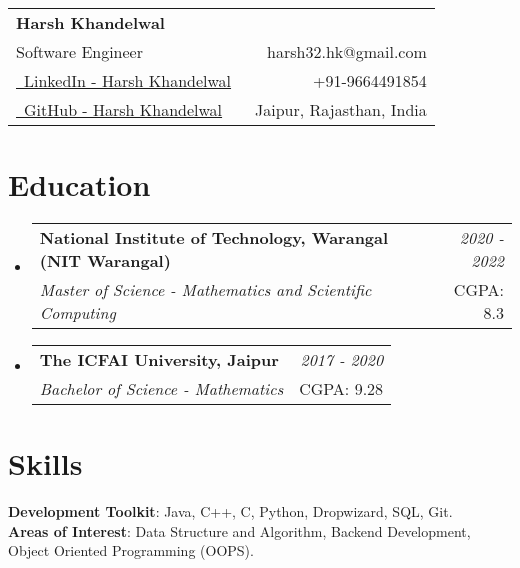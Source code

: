 \documentclass[a4paper,12pt]{article}
\makeatletter
\newcommand{\resumeSubheading}[4]{
\vspace{0.5mm}\item[]
    \begin{tabular*}{0.98\textwidth}[t]{l@{\extracolsep{\fill}}r}
        \textbf{#1} & \textit{\footnotesize{#4}} \\
        \textit{\footnotesize{#3}} &  \footnotesize{#2}\\
    \end{tabular*}
    \vspace{-1.0mm}
}
\newcommand{\resumeSubHeadingListStart}{\begin{itemize}[leftmargin=*,labelsep=0mm]}
\newcommand{\resumeSubHeadingListEnd}{\end{itemize}\vspace{2mm}}
\newcommand{\name}{Harsh Khandelwal} %
\newcommand{\phone}{9664491854} %
\newcommand{\emaila}{harsh32.hk@gmail.com} %
\makeatother
\begin{document}


\parbox{\dimexpr\linewidth-0.5cm\relax}{
\begin{tabularx}{\linewidth}{L r} \\
  \textbf{\Large \name}\\
  {Software Engineer} & \raisebox{0.0\height}{\footnotesize \faEnvelope}\ {\emaila} \\
  \href{https://www.linkedin.com/in/harsh-khandelwal-094866201/}{\raisebox{0.0\height}{\footnotesize \faLinkedin}\ LinkedIn - Harsh Khandelwal} &  {\raisebox{0.0\height}{\footnotesize \faPhone}\ +91-\phone} \\
  \href{https://github.com/redhlk}{\raisebox{0.0\height}{\footnotesize \faGithub}\ {GitHub - \name}}
  & {\raisebox{0.0\height}{\footnotesize}\ Jaipur, Rajasthan, India}\\
\end{tabularx}
}

\section{\textbf{Education}}
  \resumeSubHeadingListStart
    \resumeSubheading
      {National Institute of Technology, Warangal (NIT Warangal)}{CGPA: 8.3}
      {Master of Science - Mathematics and Scientific Computing }{2020 - 2022}
    \resumeSubheading
      {The ICFAI University, Jaipur}{CGPA: 9.28}
      {Bachelor of Science - Mathematics}{2017 - 2020}
  \resumeSubHeadingListEnd
\vspace{-5.5mm}
%


\section{\textbf{Skills}}
 \begin{itemize}[leftmargin=0.05in, label={}]
    \small{\item{
     \textbf{Development Toolkit}{: Java, C++, C, Python, Dropwizard, SQL, Git.} \\
         \vspace{2pt}
     \textbf{Areas of Interest}{: Data Structure and Algorithm, Backend Development, Object Oriented Programming (OOPS).}
    }}
 \end{itemize}
 \vspace{-12pt}
\end{document}
